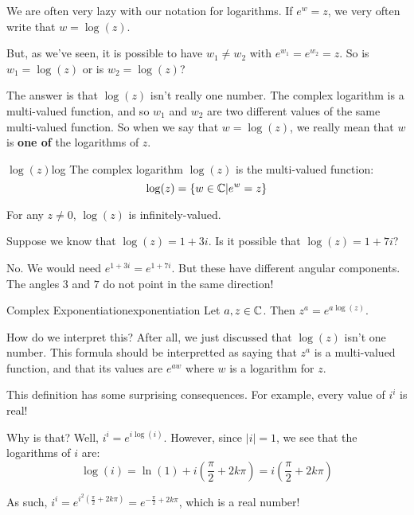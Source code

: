 \begin{notation} We are often very lazy with our notation for logarithms. If $e^w = z$, we very often write that $w = \log(z)$.

But, as we've seen, it is possible to have $w_1\ne w_2$ with $e^{w_1} = e^{w_2} = z$. So is $w_1 = \log(z)$ or is $w_2 = \log(z)$?

The answer is that $\log(z)$ isn't really one number. The complex logarithm is a multi-valued function, and so $w_1$ and $w_2$ are two different values of the same multi-valued function. So when we say that $w = \log(z)$, we really mean that $w$ is {\bf one of} the logarithms of $z$.
\end{notation}

\begin{defbo}{$\log(z)$}{log}
The complex logarithm $\log(z)$ is the multi-valued function:
$$\log(z) = \{w\in \mathbb{C}| e^w = z\}$$

For any $z\ne 0$, $\log(z)$ is infinitely-valued.
\end{defbo}


\begin{ex}{}{} Suppose we know that $\log(z) = 1 + 3i$. Is it possible that $\log(z) = 1 + 7i$?

No. We would need $e^{1 + 3i} = e^{1 + 7i}$. But these have different angular components. The angles $3$ and $7$ do not point in the same direction!
\end{ex}



\begin{defbo}{Complex Exponentiation}{exponentiation} 
Let $a,z\in \mathbb{C}$. Then $z^a = e^{a\log(z)}$.
\end{defbo}

How do we interpret this? After all, we just discussed that $\log(z)$ isn't one number. This formula should be interpretted as saying that $z^a$ is a multi-valued function, and that its values are $e^{aw}$ where $w$ is a logarithm for $z$.


\begin{ex}{}{} This definition has some surprising consequences. For example, every value of $i^i$ is real!

Why is that? Well, $i^i = e^{i\log(i)}$. However, since $|i| = 1$, we see that the logarithms of $i$ are:
$$\log(i) = \ln(1) + i\left(\frac{\pi}{2} + 2k\pi\right) = i\left(\frac{\pi}{2} + 2k\pi\right)$$

As such, $i^i = e^{i^2\left(\frac{\pi}{2} + 2k\pi\right)} = e^{-\frac{\pi}{2} + 2k\pi}$, which is a real number!\end{ex}

